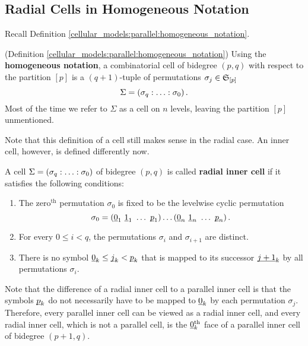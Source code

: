\subsection{Radial Cells in Homogeneous Notation}
\label{cellular_models:radial:cells_in_homogenous_notation}
Recall Definition \ref{cellular_models:parallel:homogeneous_notation}.

\begin{defi}(Definition \ref{cellular_models:parallel:homogeneous_notation})
\label{cellular_models:radial:homogeneous_notation}
Using the {\bfseries homogeneous notation}, a combinatorial cell of bidegree $(p,q)$ with respect to the partition $[p]$ is a $(q+1)$-tuple of permutations $\sigma_j \in \mathfrak S_{[p]}$
    \[
        \Sigma = \homogq \,.
    \]
    Most of the time we refer to $\Sigma$ as a cell on $n$ levels, leaving the partition $[p]$ unmentioned.
\end{defi}

Note that this definition of a cell still makes sense in the radial case.
An inner cell, however, is defined differently now.

\begin{defi}
\label{cellular_models:radial:inner_cells}
    A cell $\Sigma = \homogq$ of bidegree $(p,q)$ is called {\bfseries radial inner cell} if it satisfies the following conditions:
    \begin{enumerate}
        \item The zero${}^{\text{th}}$ permutation $\sigma_0$ is fixed to be the levelwise cyclic permutation 
              \[\sigma_0 = (\ul 0_1\ \ul 1_1\ \ldots\ \ul p_1)\ldots (\ul 0_n\ \ul 1_n\ \ldots\ \ul p_n)\,.\]
        \item For every $0 \le i < q$, the permutations $\sigma_i$ and $\sigma_{i+1}$ are distinct.
        \item There is no symbol $\underline{\smash{0}}_k \le \underline{\smash{j}}_k < \underline{\smash{p}}_k$ that is mapped to its successor $\underline{\smash{j+1}}_k$ by all permutations $\sigma_i$.
    \end{enumerate}
\end{defi}

Note that the difference of a radial inner cell to a parallel inner cell is 
that the symbols $\underline{\smash{p}}_k$ do not necessarily have to be mapped to $\underline{\smash{0}}_k$ by each permutation $\sigma_j$.
Therefore, every parallel inner cell can be viewed as a radial inner cell, 
and every radial inner cell, which is not a parallel cell, is the $\underline{\smash{0}}_k^{\text{th}}$ face of a parallel inner cell of bidegree $(p + 1, q)$.
 

